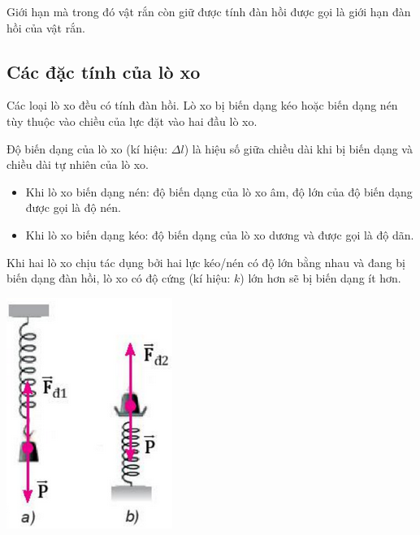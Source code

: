 Giới hạn mà trong đó vật rắn còn giữ được tính đàn hồi được gọi là giới hạn đàn hồi của vật rắn.

\subsection{Các đặc tính của lò xo}
Các loại lò xo đều có tính đàn hồi. Lò xo bị biến dạng kéo hoặc biến dạng nén tùy thuộc vào chiều của lực đặt vào hai đầu lò xo.

\begin{minipage}{0.6\textwidth}
	Độ biến dạng của lò xo (kí hiệu: $\Delta l$) là hiệu số giữa chiều dài khi bị biến dạng và chiều dài tự nhiên của lò xo.
	\begin{itemize}
		\item Khi lò xo biến dạng nén: độ biến dạng của lò xo âm, độ lớn của độ biến dạng được gọi là độ nén.
		\item Khi lò xo biến dạng kéo: độ biến dạng của lò xo dương và được gọi là độ dãn.
	\end{itemize}
	
	
	Khi hai lò xo chịu tác dụng bởi hai lực kéo/nén có độ lớn bằng nhau và đang bị biến dạng đàn hồi, lò xo có độ cứng (kí hiệu: $k$) lớn hơn sẽ bị biến dạng ít hơn.
\end{minipage}
\begin{minipage}{0.4\textwidth}
	\begin{center}
		\includegraphics[scale=0.8]{../figs/G10-028-2}
	\end{center}
\end{minipage}


